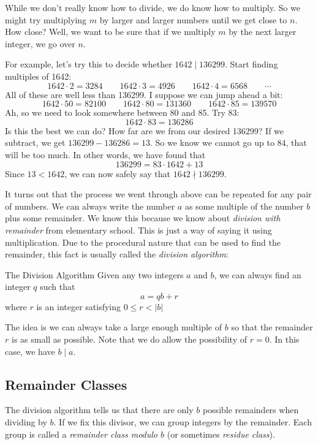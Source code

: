 \documentclass[12pt]{article}
\begin{document}
While we don't really know how to divide, we do know how to multiply.  So we might try multiplying $m$ by larger and larger numbers until we get close to $n$.  How close?  Well, we want to be sure that if we multiply $m$ by the next larger integer, we go over $n$.  

For example, let's try this to decide whether $1642 \mid 136299$.  Start finding multiples of 1642:
\[1642 \cdot 2 = 3284 \qquad 1642 \cdot 3 = 4926 \qquad 1642\cdot 4 = 6568 \qquad \cdots\]
All of these are well less than 136299.  I suppose we can jump ahead a bit:
\[1642 \cdot 50 = 82100 \qquad 1642 \cdot 80 = 131360 \qquad 1642 \cdot 85 = 139570\]
Ah, so we need to look somewhere between 80 and 85.  Try 83:
\[1642 \cdot 83 = 136286\]
Is this the best we can do?  How far are we from our desired 136299?  If we subtract, we get $136299 - 136286 = 13$.  So we know we cannot go up to 84, that will be too much.  In other words, we have found that
\[136299 = 83 \cdot 1642 + 13\]
Since $13 < 1642$, we can now safely say that $1642 \nmid 136299$.

It turns out that the process we went through above can be repeated for any pair of numbers.  We can always write the number $a$ as some multiple of the number $b$ plus some remainder.  We know this because we know about {\em division with remainder} from elementary school.  This is just a way of saying it using multiplication.  Due to the procedural nature that can be used to find the remainder, this fact is usually called the {\em division algorithm}:

\begin{defbox}{The Division Algorithm}
	Given any two integers $a$ and $b$, we can always find an integer $q$ such that 
	\[a = qb + r\]
	where $r$ is an integer satisfying $0 \le r < |b|$
\end{defbox}

The idea is we can always take a large enough multiple of $b$ so that the remainder $r$ is as small as possible.  Note that we do allow the possibility of $r = 0$.  In this case, we have $b \mid a$.


\subsection{Remainder Classes}


The division algorithm tells us that there are only $b$ possible remainders when dividing by $b$.  If we fix this divisor, we can group integers by the remainder. Each group is called a {\em remainder class modulo $b$} (or sometimes {\em residue class}). 
\end{document}

